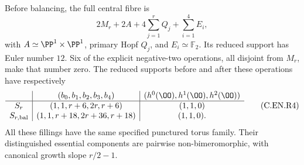 \begin{proposition}
Before balancing, the full central fibre is
\[
 2M_r+2A+4\sum_{j=1}^r Q_j+\sum_{i=1}^4E_i,
                                                               \tag{C.EN.R3}\label{cdp:eq:C.EN.R3}
\]
with $A\simeq\PP^1\times\PP^1$, primary Hopf
$Q_j$, and $E_i\simeq\mathbb F_2$.
Its reduced support has Euler number $12$.
Six of the explicit negative-two operations,
all disjoint from $M_r$, make that number zero.
The reduced supports before and after these
operations have respectively
\[
 \begin{array}{c|c|c}
 &(b_0,b_1,b_2,b_3,b_4)&(h^0(\OO),h^1(\OO),h^2(\OO))\\ \hline
 S_r&(1,1,r+6,2r,r+6)&(1,1,0)\\
 S_{r,\mathrm{bal}}&(1,1,r+18,2r+36,r+18)&(1,1,0).
 \end{array}                                             \tag{C.EN.R4}\label{cdp:eq:C.EN.R4}
\]
All these fillings have the same specified punctured
torus family. Their distinguished essential components
are pairwise non-bimeromorphic, with canonical growth
slope $r/2-1$.
\end{proposition}

